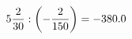\documentclass[preview]{standalone}
\begin{document}
\begin{align*}
5 { 2 \over 30 }  :  \left( - { 2 \over 150 } \right) = -380.0
\end{align*}
\end{document}
